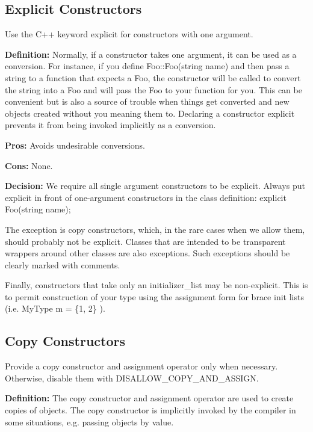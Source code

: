 \subsection*{Explicit Constructors}

Use the C++ keyword explicit for constructors with one argument.

{\bfseries Definition\+:} Normally, if a constructor takes one argument, it can be used as a conversion. For instance, if you define Foo\+::\+Foo(string name) and then pass a string to a function that expects a Foo, the constructor will be called to convert the string into a Foo and will pass the Foo to your function for you. This can be convenient but is also a source of trouble when things get converted and new objects created without you meaning them to. Declaring a constructor explicit prevents it from being invoked implicitly as a conversion.

{\bfseries Pros\+:} Avoids undesirable conversions.

{\bfseries Cons\+:} None.

{\bfseries Decision\+:} We require all single argument constructors to be explicit. Always put explicit in front of one-\/argument constructors in the class definition\+: explicit Foo(string name);

The exception is copy constructors, which, in the rare cases when we allow them, should probably not be explicit. Classes that are intended to be transparent wrappers around other classes are also exceptions. Such exceptions should be clearly marked with comments.

Finally, constructors that take only an initializer\+\_\+list may be non-\/explicit. This is to permit construction of your type using the assignment form for brace init lists (i.\+e. {\ttfamily My\+Type m = \{1, 2\}} ).

\subsection*{Copy Constructors}

Provide a copy constructor and assignment operator only when necessary. Otherwise, disable them with {\ttfamily D\+I\+S\+A\+L\+L\+O\+W\+\_\+\+C\+O\+P\+Y\+\_\+\+A\+N\+D\+\_\+\+A\+S\+S\+I\+GN}.

{\bfseries Definition\+:} The copy constructor and assignment operator are used to create copies of objects. The copy constructor is implicitly invoked by the compiler in some situations, e.\+g. passing objects by value.

